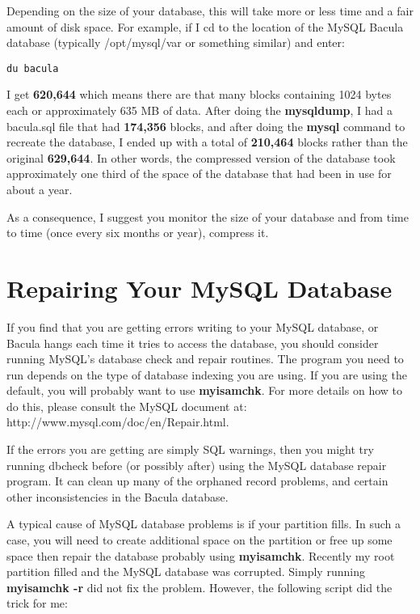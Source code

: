 Depending on the size of your database, this will take more or less time and a
fair amount of disk space. For example, if I cd to the location of the MySQL
Bacula database (typically /opt/mysql/var or something similar) and enter: 

\footnotesize
\begin{verbatim}
du bacula
\end{verbatim}
\normalsize

I get {\bf 620,644} which means there are that many blocks containing 1024
bytes each or approximately 635 MB of data. After doing the {\bf mysqldump}, I
had a bacula.sql file that had {\bf 174,356} blocks, and after doing the {\bf
mysql} command to recreate the database, I ended up with a total of {\bf
210,464} blocks rather than the original {\bf 629,644}. In other words, the
compressed version of the database took approximately one third of the space
of the database that had been in use for about a year. 

As a consequence, I suggest you monitor the size of your database and from
time to time (once every six months or year), compress it. 

\label{DatabaseRepair}
\label{RepairingMySQL}
\section{Repairing Your MySQL Database}

If you find that you are getting errors writing to your MySQL database, or
Bacula hangs each time it tries to access the database, you should consider
running MySQL's database check and repair routines. The program you need to
run depends on the type of database indexing you are using. If you are using
the default, you will probably want to use {\bf myisamchk}. For more details
on how to do this, please consult the MySQL document at: 
{http://www.mysql.com/doc/en/Repair.html}. 

If the errors you are getting are simply SQL warnings, then you might try
running dbcheck before (or possibly after) using the MySQL database repair
program. It can clean up many of the orphaned record problems, and certain
other inconsistencies in the Bacula database. 

A typical cause of MySQL database problems is if your partition fills. In
such a case, you will need to create additional space on the partition or
free up some space then repair the database probably using {\bf myisamchk}.
Recently my root partition filled and the MySQL database was corrupted.
Simply running {\bf myisamchk -r} did not fix the problem. However,
the following script did the trick for me:

